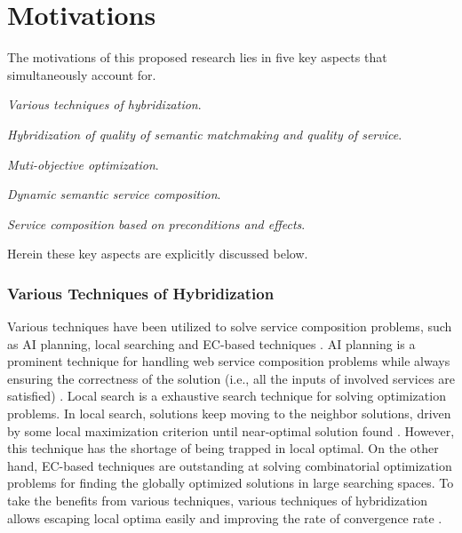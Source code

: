 \section{Motivations}\label{C:motivation}
The motivations of this proposed research lies in five key aspects that simultaneously account for. 
\begin{enumerate*}
 \item \emph{Various techniques of hybridization}.
 \item \emph{Hybridization of quality of semantic matchmaking and quality of service}.
 \item \emph{Muti-objective optimization}.
 \item \emph{Dynamic semantic service composition}.
 \item \emph{Service composition based on preconditions and effects}.
\end{enumerate*}
Herein these key aspects are explicitly discussed below. 
\subsubsection{Various Techniques of Hybridization}

Various techniques have been utilized to solve service composition problems, such as AI planning, local searching and EC-based techniques \cite{feng2013dynamic,parejo2008qos,qi2010combining,wang2014automated}. AI planning is a prominent technique for handling web service composition problems while always ensuring the correctness of the solution (i.e., all the inputs of involved services are satisfied) \cite{wang2014automated}.  Local search is a exhaustive search technique for solving optimization problems. In local search, solutions keep moving to the neighbor solutions, driven by some local maximization criterion until near-optimal solution found \cite{parejo2008qos}. However, this technique has the shortage of being trapped in local optimal. On the other hand, EC-based techniques are outstanding at solving combinatorial optimization problems for finding the globally optimized solutions in large searching spaces. To take the benefits from various techniques,  various techniques of hybridization allows escaping local optima easily and improving the rate of convergence rate \cite{renders1996hybrid}.

